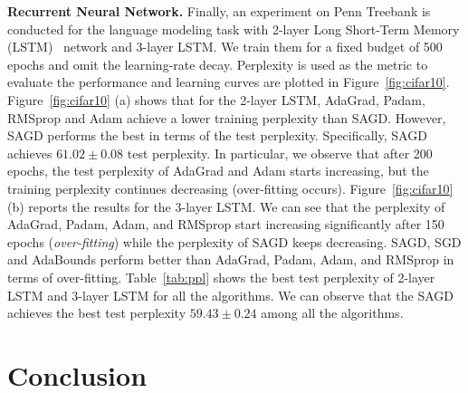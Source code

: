 \documentclass[11pt]{article}
\begin{document}
\textbf{Recurrent Neural Network.}
Finally, an experiment on Penn Treebank is conducted for the language modeling task with 2-layer Long Short-Term Memory (LSTM)~\citep{stni2018} network and 3-layer LSTM. We train them for a fixed budget of 500 epochs and omit the learning-rate decay. Perplexity is used as the metric to evaluate the performance and learning curves are plotted in Figure~\ref{fig:cifar10}. 
Figure~\ref{fig:cifar10} (a) shows that for the 2-layer LSTM, AdaGrad, Padam, RMSprop and Adam achieve a lower training perplexity than \textsc{SAGD}. However, \textsc{SAGD} performs the best in terms of the test perplexity. Specifically, \textsc{SAGD} achieves $61.02 \pm 0.08$ test perplexity. 
In particular, we observe that after 200 epochs, the test perplexity of AdaGrad and Adam starts increasing, but the training perplexity continues decreasing (over-fitting occurs).  
Figure~\ref{fig:cifar10} (b) reports the results for the 3-layer LSTM. We can see that the perplexity of AdaGrad, Padam, Adam, and RMSprop start increasing significantly after 150 epochs (\emph{over-fitting}) while the perplexity of \textsc{SAGD} keeps decreasing. \textsc{SAGD}, SGD and AdaBounds perform better than AdaGrad, Padam, Adam, and RMSprop in terms of over-fitting.
Table~\ref{tab:ppl} shows the best test perplexity of 2-layer LSTM and 3-layer LSTM for all the algorithms. We can observe that the \textsc{SAGD} achieves the best test perplexity $59.43 \pm 0.24$ among all the algorithms. 

\begin{table}[H]
\small
\caption{ Test Perplexity of LSTMs on Penn Treebank. Bold number indicates the best result.}\label{tab:ppl}
\end{table}


\section{Conclusion}\label{sec: conclusion}
\end{document}
